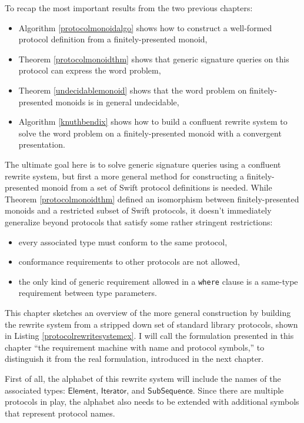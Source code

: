 \documentclass[a4paper,headsepline,bibliography=totoc,toc=flat,fleqn,twoside=semi]{scrbook}
\theoremstyle{definition}
\theoremstyle{definition}
\theoremstyle{definition}
\newcommand{\namesym}[1]{\mathsf{#1}}
\begin{document}
To recap the most important results from the two previous chapters:
\begin{itemize}
\item Algorithm \ref{protocolmonoidalgo} shows how to construct a well-formed protocol definition from a finitely-presented monoid,

\item Theorem \ref{protocolmonoidthm} shows that generic signature queries on this protocol can express the word problem,
\item Theorem \ref{undecidablemonoid} shows that the word problem on finitely-presented monoids is in general undecidable,
\item Algorithm \ref{knuthbendix} shows how to build a confluent rewrite system to solve the word problem on a finitely-presented monoid with a convergent presentation.
\end{itemize}
The ultimate goal here is to solve generic signature queries using a confluent rewrite system, but first a more general method for constructing a finitely-presented monoid from a set of Swift protocol definitions is needed. While Theorem \ref{protocolmonoidthm} defined an isomorphism between finitely-presented monoids and a restricted subset of Swift protocols, it doesn't immediately generalize beyond protocols that satisfy some rather stringent restrictions:
\begin{itemize}
\item every associated type must conform to the same protocol,
\item conformance requirements to other protocols are not allowed,
\item the only kind of generic requirement allowed in a \texttt{where} clause is a same-type requirement between type parameters.
\end{itemize}
This chapter sketches an overview of the more general construction by building the rewrite system from a stripped down set of standard library protocols, shown in Listing \ref{protocolrewritesystemex}. I will call the formulation presented in this chapter ``the requirement machine with name and protocol symbols,'' to distinguish it from the real formulation, introduced in the next chapter.

First of all, the alphabet of this rewrite system will include the names of the associated types: $\namesym{Element}$, $\namesym{Iterator}$, and $\namesym{SubSequence}$. Since there are multiple protocols in play, the alphabet also needs to be extended with additional symbols that represent protocol names.
\end{document}
